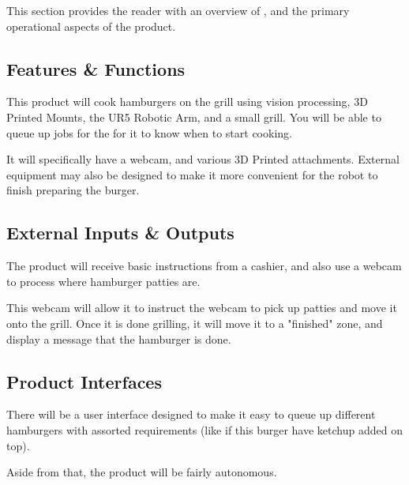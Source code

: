 This section provides the reader with an overview of \productname{}, and the primary operational aspects of the product.

\subsection{Features \& Functions}

This product will cook hamburgers on the grill using vision processing, 3D Printed Mounts, the UR5 Robotic Arm, and a small grill. You will be able to queue up jobs for the \productname{} for it to know when to start cooking. 

It will specifically have a webcam, and various 3D Printed attachments. External equipment may also be designed to make it more convenient for the robot to finish preparing the burger. 

\subsection{External Inputs \& Outputs}
The product will receive basic instructions from a cashier, and also use a webcam to process where hamburger patties are. 

This webcam will allow it to instruct the webcam to pick up patties and move it onto the grill. Once it is done grilling, it will move it to a "finished" zone, and display a message that the hamburger is done. 


\subsection{Product Interfaces}
There will be a user interface designed to make it easy to queue up different hamburgers with assorted requirements (like if this burger have ketchup added on top). 

Aside from that, the product will be fairly autonomous. 